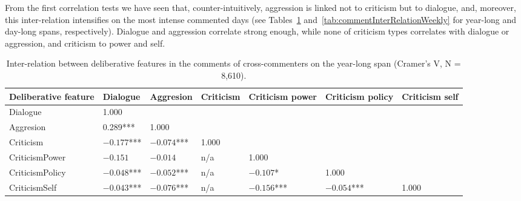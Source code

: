 From the first correlation tests we have seen that, counter-intuitively, aggression is linked not to criticism but to dialogue, and, moreover, this inter-relation intensifies on the most intense commented days (see Tables~\cref{tab:commentInterRelationYearly} and~\cref{tab:commentInterRelationWeekly} for year-long and day-long spans, respectively). Dialogue and aggression correlate strong enough, while none of criticism types correlates with dialogue or aggression, and criticism to power and self.

\begin{table}[ht]%
	\centering
	\caption{Inter-relation between deliberative features in the comments of cross-commenters on the year-long span (Cramer’s V, N = 8,610).}%
	\label{tab:commentInterRelationYearly}%
	\begin{adjustbox}{width=1\textwidth}
		\small
		\begin{tabular}{ l  l  l  l  l  l  l }%
			\toprule
			Deliberative feature & Dialogue & Aggresion & Criticism & Criticism power & Criticism policy & Criticism self \\
			\hline
			Dialogue & 1.000 & & & & & \\
			Aggresion & 0.289*** & 1.000 & & & & \\
			Criticism & \(-0.177\)*** & \(-0.074\)*** & 1.000 & & & \\
			CriticismPower & \(-0.151\) & \(-0.014\) & n/a & 1.000 & & \\
			CriticismPolicy & \(-0.048\)*** & \(-0.052\)*** & n/a & \(-0.107\)* & 1.000 & \\
			CriticismSelf & \(-0.043\)*** & \(-0.076\)*** & n/a & \(-0.156\)*** & \(-0.054\)*** & 1.000 \\
			\bottomrule
		\end{tabular}%
	\end{adjustbox}
\end{table}

